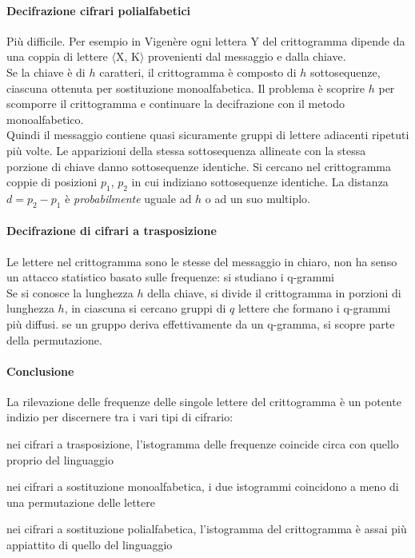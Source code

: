 \documentclass[10pt]{book}
\begin{document}
\paragraph{Decifrazione cifrari polialfabetici} Più difficile. Per esempio in Vigenère ogni lettera Y del crittogramma dipende da una coppia di lettere $\langle$X, K$\rangle$ provenienti dal messaggio e dalla chiave.\\
Se la chiave è di $h$ caratteri, il crittogramma è composto di $h$ sottosequenze, ciascuna ottenuta per sostituzione monoalfabetica. Il problema è scoprire $h$ per scomporre il crittogramma e continuare la decifrazione con il metodo monoalfabetico.\\
Quindi il messaggio contiene quasi sicuramente gruppi di lettere adiacenti ripetuti più volte. Le apparizioni della stessa sottosequenza allineate con la stessa porzione di chiave danno sottosequenze identiche. Si cercano nel crittogramma coppie di posizioni $p_1$, $p_2$ in cui indiziano sottosequenze identiche. La distanza $d = p_2 - p_1$ è \textit{probabilmente} uguale ad $h$ o ad un suo multiplo.
\paragraph{Decifrazione di cifrari a trasposizione}
Le lettere nel crittogramma sono le stesse del messaggio in chiaro, non ha senso un attacco statistico basato sulle frequenze: si studiano i q-grammi\\
Se si conosce la lunghezza $h$ della chiave, si divide il crittogramma in porzioni di lunghezza $h$, in ciascuna si cercano gruppi di $q$ lettere che formano i q-grammi più diffusi. se un gruppo deriva effettivamente da un q-gramma, si scopre parte della permutazione.
\paragraph{Conclusione} La rilevazione delle frequenze delle singole lettere del crittogramma è un potente indizio per discernere tra i vari tipi di cifrario:
\begin{list}{}{}
	\item nei cifrari a trasposizione, l'istogramma delle frequenze coincide circa con quello proprio del linguaggio
	\item nei cifrari a sostituzione monoalfabetica, i due istogrammi coincidono a meno di una permutazione delle lettere
	\item nei cifrari a sostituzione polialfabetica, l'istogramma del crittogramma è assai più appiattito di quello del linguaggio
\end{list}
\end{document}
